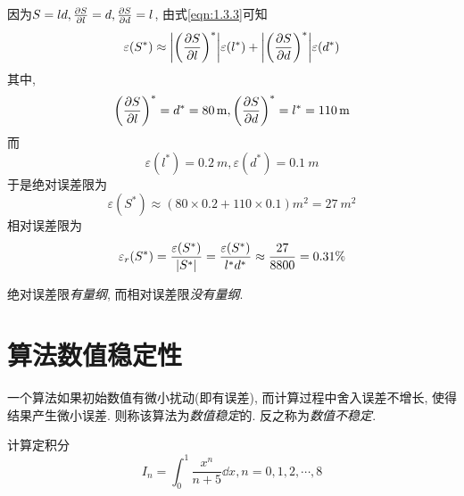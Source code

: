 \begin{solution}
    因为$S=ld, \pdv{S}{l}=d, \pdv{S}{d}=l$, 由式\ref{eqn:1.3.3}可知
    \begin{equation*}
        \varepsilon(S^*)\approx\abs{\left(\pdv{S}{l}\right)^*}\varepsilon(l^*)+\abs{\left(\pdv{S}{d}\right)^*}\varepsilon(d^*)
    \end{equation*}
    其中,
    \begin{equation*}
        \left(\pdv{S}{l}\right)^*=d^*=\SI{80}{m}, \left(\pdv{S}{d}\right)^*=l^*=\SI{110}{m}
    \end{equation*}
    而
    \begin{equation*}
        \varepsilon(l^*)=\SI{0.2}{m}, \varepsilon(d^*)=\SI{0.1}{m}
    \end{equation*}
    于是绝对误差限为
    \begin{equation*}
        \varepsilon(S^*)\approx(80\times0.2+110\times0.1)\si{m^2}=\SI{27}{m^2}
    \end{equation*}
    相对误差限为
    \begin{equation*}
        \varepsilon_r(S^*)=\frac{\varepsilon(S^*)}{\abs{S^*}}=\frac{\varepsilon(S^*)}{l^*d^*}\approx\frac{27}{8800}=0.31\%
    \end{equation*}
\end{solution}

\begin{notice}
    绝对误差限\emph{有量纲}, 而相对误差限\emph{没有量纲}.
\end{notice}

\section{算法数值稳定性}

\begin{definition}[数值稳定]
    一个算法如果初始数值有微小扰动(即有误差), 而计算过程中舍入误差不增长, 使得结果产生微小误差. 则称该算法为\emph{数值稳定}的. 反之称为\emph{数值不稳定}.
\end{definition}

\begin{example}
    计算定积分
    \begin{equation*}
        I_n = \int_0^1\frac{x^n}{n+5}\dd{x}, n=0,1,2,\cdots,8
    \end{equation*}
\end{example}

